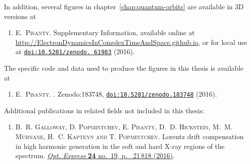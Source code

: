 \noindent
In addition, several figures in chapter~\ref{chap:quantum-orbits} are available in 3D versions at
\begin{enumerate}
\item[{\hypersetup{citecolor=black}\cite{SupplementaryInformation}}]
\textsc{E.~Pisanty}. Supplementary Information, available online at \url{http://ElectronDynamicsInComplexTimeAndSpace.github.io}, or for local use at \href{http://dx.doi.org/10.5281/zenodo.61983}{\texttt{doi:10.5281/zenodo. 61983}} (2016).
\end{enumerate}


\pagebreak

\noindent
The specific code and data used to produce the figures in this thesis is available at
\begin{enumerate}
\item[{\hypersetup{citecolor=black}\cite{FigureMakerThesis}}]
\textsc{E.~Pisanty}.
.
\newblock Zenodo:183748,
  \href{http://dx.doi.org/10.5281/zenodo.183748}{\texttt{doi:10.5281/zenodo.183748}}
  (2016).
\end{enumerate}



\noindent
Additional publications in related fields not included in this thesis:

\begin{enumerate}
\item[{\hypersetup{citecolor=black}\cite{galloway_lorentz_2016}}]
\textsc{B.~R. Galloway, D. Popmintchev, E. Pisanty, D.~D. Hickstein, M.~M. Murnane, H.~C. Kapteyn and T. Popmintchev}.
\newblock Lorentz drift compensation in high harmonic generation in the soft
  and hard {X}-ray regions of the spectrum.
  \href{https://doi.org/10.1364/OE.24.021818}{\emph{Opt. Express} \textbf{24} no.~19, p.~ 21\,818 (2016)}.
\end{enumerate}










